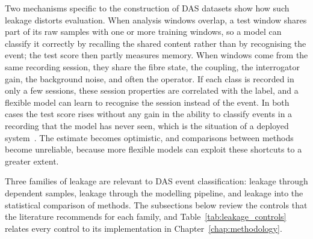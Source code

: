 Two mechanisms specific to the construction of DAS datasets show how such leakage distorts evaluation. When analysis windows overlap, a test window shares part of its raw samples with one or more training windows, so a model can classify it correctly by recalling the shared content rather than by recognising the event; the test score then partly measures memory. When windows come from the same recording session, they share the fibre state, the coupling, the interrogator gain, the background noise, and often the operator. If each class is recorded in only a few sessions, these session properties are correlated with the label, and a flexible model can learn to recognise the session instead of the event. In both cases the test score rises without any gain in the ability to classify events in a recording that the model has never seen, which is the situation of a deployed system~\cite{roberts2017crossvalidation,kapoor2023leakage}. The estimate becomes optimistic, and comparisons between methods become unreliable, because more flexible models can exploit these shortcuts to a greater extent.

Three families of leakage are relevant to DAS event classification: leakage through dependent samples, leakage through the modelling pipeline, and leakage into the statistical comparison of methods. The subsections below review the controls that the literature recommends for each family, and Table~\ref{tab:leakage_controls} relates every control to its implementation in Chapter~\ref{chap:methodology}.

